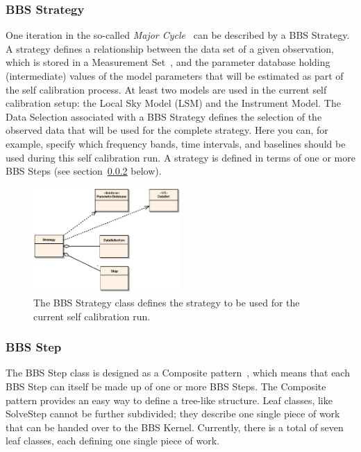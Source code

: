 \documentclass[10pt]{lofar}
\begin{document}
\subsubsection{BBS Strategy}
\label{subsubsec:design-strategy}
One iteration in the so-called \emph{Major
Cycle}~\cite[sec.~4.1]{LOFAR-ASTRON-SDD-050} can be described by a BBS
Strategy. A strategy defines a relationship between the data set of a given
observation, which is stored in a Measurement Set~\cite{aips++note229}, and
the parameter database holding (intermediate) values of the model parameters
that will be estimated as part of the self calibration process. At least two
models are used in the current self calibration setup: the Local Sky Model
(LSM) and the Instrument Model. The Data Selection associated with a BBS
Strategy defines the selection of the observed data that will be used for the
complete strategy. Here you can, for example, specify which frequency bands,
time intervals, and baselines should be used during this self calibration
run. A strategy is defined in terms of one or more BBS Steps (see
section~\ref{subsubsec:design-step} below).

\begin{figure}[!ht]
\centering
\includegraphics[width=0.5\textwidth]{images/bbs-strategy-class-diagram}
\caption{The BBS Strategy class defines the strategy to be used for the
current self calibration run.}
\label{fig:bbsstrategy}
\end{figure}

\subsubsection{BBS Step}
\label{subsubsec:design-step}
The BBS Step class is designed as a Composite pattern~\cite{Gamma1995}, which
means that each BBS Step can itself be made up of one or more BBS Steps. The
Composite pattern provides an easy way to define a tree-like structure. Leaf
classes, like SolveStep cannot be further subdivided; they describe one single
piece of work that can be handed over to the BBS Kernel. Currently, there is a
total of seven leaf classes, each defining one single piece of work.
\end{document}
